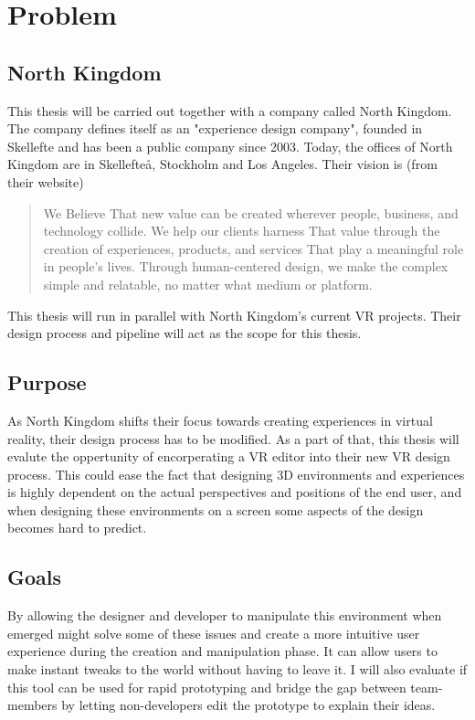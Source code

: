 \chapter{Problem}

\section{North Kingdom}
This thesis will be carried out together with a company called North Kingdom. The company defines itself as an "experience design company", founded in Skellefte and has been a public company since 2003. Today, the offices of North Kingdom are in Skellefte\aa, Stockholm and Los Angeles. \cite{northkingdom} Their vision is (from their website)
\begin{quote}
We Believe That new value can be created wherever people, business, and technology collide. We help our clients harness That value through the creation of experiences, products, and services That play a meaningful role in people's lives. Through human-centered design, we make the complex simple and relatable, no matter what medium or platform. \cite{northkingdom}
\end{quote}
This thesis will run in parallel with North Kingdom's current VR projects. Their design process and pipeline will act as the scope for this thesis.

\section{Purpose}
As North Kingdom shifts their focus towards creating experiences in virtual reality, their design process has to be modified. As a part of that, this thesis will evalute the oppertunity of encorperating a VR editor into their new VR design process. This could ease the fact that designing 3D environments and experiences is highly dependent on the actual perspectives and positions of the end user, and when designing these environments on a screen some aspects of the design becomes hard to predict.

\section{Goals}
By allowing the designer and developer to manipulate this environment when emerged might solve some of these issues and create a more intuitive user experience during the creation and manipulation phase. It can allow users to make instant tweaks to the world without having to leave it. I will also evaluate if this tool can be used for rapid prototyping and bridge the gap between team-members by letting non-developers edit the prototype to explain their ideas.


